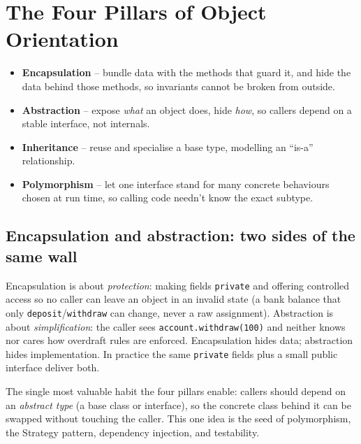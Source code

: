 \section{The Four Pillars of Object Orientation}
\label{sec:lld-four-pillars}


\begin{patternbox}
\begin{itemize}
  \item \textbf{Encapsulation} -- bundle data with the methods that guard
        it, and hide the data behind those methods, so invariants cannot
        be broken from outside.
  \item \textbf{Abstraction} -- expose \emph{what} an object does, hide
        \emph{how}, so callers depend on a stable interface, not
        internals.
  \item \textbf{Inheritance} -- reuse and specialise a base type,
        modelling an ``is-a'' relationship.
  \item \textbf{Polymorphism} -- let one interface stand for many
        concrete behaviours chosen at run time, so calling code needn't
        know the exact subtype.
\end{itemize}
\end{patternbox}

\subsection*{Encapsulation and abstraction: two sides of the same wall}

Encapsulation is about \emph{protection}: making fields \texttt{private}
and offering controlled access so no caller can leave an object in an
invalid state (a bank balance that only \texttt{deposit}/\texttt{withdraw}
can change, never a raw assignment). Abstraction is about
\emph{simplification}: the caller sees \texttt{account.withdraw(100)} and
neither knows nor cares how overdraft rules are enforced. Encapsulation
hides data; abstraction hides implementation. In practice the same
\texttt{private} fields plus a small public interface deliver both.

\begin{ideabox}
The single most valuable habit the four pillars enable: callers should
depend on an \emph{abstract type} (a base class or interface), so the
concrete class behind it can be swapped without touching the caller. This
one idea is the seed of polymorphism, the Strategy pattern, dependency
injection, and testability.
\end{ideabox}

